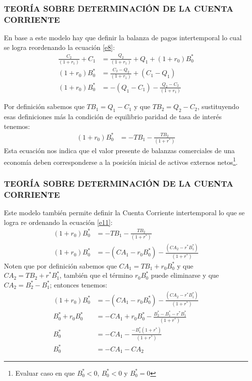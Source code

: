 \documentclass[10pt, xcolor=table, x11names]{beamer}
\begin{document}
\begin{frame}[label=9]
	\frametitle{{\normalsize TEORÍA SOBRE DETERMINACIÓN DE LA CUENTA CORRIENTE} {}}
En base a este modelo hay que definir la balanza de pagos intertemporal lo cual se logra reordenando la ecuación \ref{e8}:
	\begin{align}
	\frac{C_{2}}{(1+r_{1})}+C_{1}&=\frac{Q_{2}}{(1+r_{1})}+Q_{1} +(1+r_{0})B_{0}^{*}\nonumber \\
	(1+r_{0})B_{0}^{*}&=\frac{C_{2}-Q_{2}}{(1+r_{1})}+(C_{1}-Q_{1})\nonumber \\
	(1+r_{0})B_{0}^{*}&=-(Q_{1}-C_{1})-\frac{Q_{2}-C_{2}}{(1+r_{1})}\nonumber 
	\end{align}

Por definición sabemos que $TB_{1}=Q_{1}-C_{1} $ y que $TB_{2}=Q_{2}-C_{2} $, sustituyendo esas definiciones más la condición de equilibrio paridad de tasa de interés tenemos:
\begin{align}
(1+r_{0})B_{0}^{*}&=-TB_{1}-\frac{TB_{2}}{(1+r^{*})}\label{e11}
\end{align}
Esta ecuación nos indica que el valor presente de balanzas comerciales de una economía deben corresponderse a la posición inicial de activos externos netos\footnote{Evaluar caso en que $B_{0}^{*}<0$, $B_{0}^{*}<0$ y $B_{0}^{*}=0$}.  
\end{frame}

\begin{frame}[label=10]
	\frametitle{{\normalsize TEORÍA SOBRE DETERMINACIÓN DE LA CUENTA CORRIENTE} {}}
Este modelo también permite definir la Cuenta Corriente intertemporal lo que se logra re ordenando la ecuación \ref{e11}:
	\begin{align}
	(1+r_{0})B_{0}^{*}&=-TB_{1}-\frac{TB_{2}}{(1+r^{*})}\nonumber \\
	(1+r_{0})B_{0}^{*}&=-(CA_{1}-r_{0} B_{0}^{*})-\frac{(CA_{2}-r^{*} B_{1}^{*})}{(1+r^{*})}\nonumber 
	\end{align}
Noten que por definición sabemos que $CA_{1}=TB_{1}+r_{0}B_{0}^{*} $ y que $CA_{2}=TB_{2}+r^{*}B_{1}^{*} $, también que el término $r_{0}B_{0}^{*}$ puede eliminarse y que $CA_{2}=B_{2}^{*}-B_{1}^{*} $; entonces tenemos:
\begin{align}
(1+r_{0})B_{0}^{*}&=-(CA_{1}-r_{0} B_{0}^{*})-\frac{(CA_{2}-r^{*} B_{1}^{*})}{(1+r^{*})}\nonumber \\
B_{0}^{*}+r_{0}B_{0}^{*}&=-CA_{1}+r_{0}B_{0}^{*}-\frac{B_{2}^{*}-B_{1}^{*} -r^{*} B_{1}^{*}}{(1+r^{*})}\nonumber \\
B_{0}^{*}&=-CA_{1}-\frac{-B_{1}^{*}(1+r^{*})}{(1+r^{*})}\nonumber \\
B_{0}^{*}&=-CA_{1}-CA_{2} 
\end{align}	
	
\end{frame}
\end{document}
